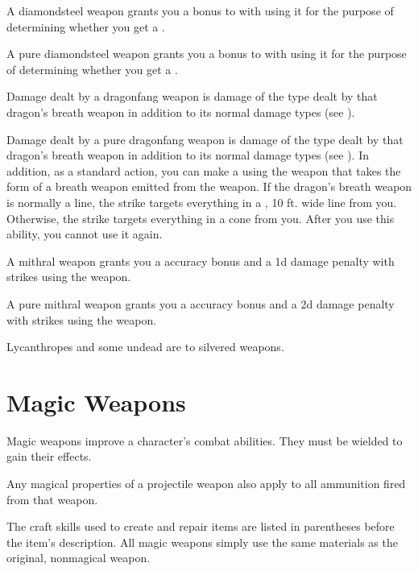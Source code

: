          A diamondsteel weapon grants you a  bonus to  with  using it for the purpose of determining whether you get a .

         A pure diamondsteel weapon grants you a  bonus to  with  using it for the purpose of determining whether you get a .

         Damage dealt by a dragonfang weapon is damage of the type dealt by that dragon's breath weapon in addition to its normal damage types (see ).

         Damage dealt by a pure dragonfang weapon is damage of the type dealt by that dragon's breath weapon in addition to its normal damage types (see ).
        In addition, as a standard action, you can make a  using the weapon that takes the form of a breath weapon emitted from the weapon.
        If the dragon's breath weapon is normally a line, the strike targets everything in a \arealarge, 10 ft. wide line from you.
        Otherwise, the strike targets everything in a \areamed cone from you.
        After you use this ability, you  cannot use it again.

         A mithral weapon grants you a  accuracy bonus and a \minus1d damage penalty with strikes using the weapon.

         A pure mithral weapon grants you a  accuracy bonus and a \minus2d damage penalty with strikes using the weapon.

         Lycanthropes and some undead are  to silvered weapons.

\newpage
\section{Magic Weapons}
    Magic weapons improve a character's combat abilities.
    They must be wielded to gain their effects.

     Any magical properties of a projectile weapon also apply to all ammunition fired from that weapon.

     The craft skills used to create and repair items are listed in parentheses before the item's description.
    All magic weapons simply use the same materials as the original, nonmagical weapon.


